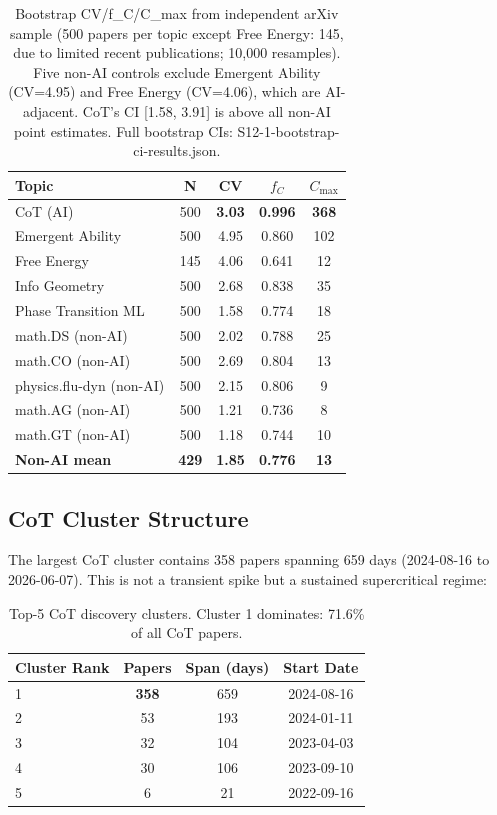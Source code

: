\documentclass[12pt]{article}
\begin{document}
\begin{table}[t]
  \centering
  \begin{tabular}{lcccc}
    \toprule
    \textbf{Topic} & \textbf{N} & \textbf{CV} & \textbf{$f_C$} & \textbf{$C_{\max}$} \\
    \midrule
    CoT (AI) & 500 & \textbf{3.03} & \textbf{0.996} & \textbf{368} \\
    Emergent Ability & 500 & 4.95 & 0.860 & 102 \\
    Free Energy & 145 & 4.06 & 0.641 & 12 \\
    Info Geometry & 500 & 2.68 & 0.838 & 35 \\
    Phase Transition ML & 500 & 1.58 & 0.774 & 18 \\
    \midrule
    math.DS (non-AI) & 500 & 2.02 & 0.788 & 25 \\
    math.CO (non-AI) & 500 & 2.69 & 0.804 & 13 \\
    physics.flu-dyn (non-AI) & 500 & 2.15 & 0.806 & 9 \\
    math.AG (non-AI) & 500 & 1.21 & 0.736 & 8 \\
    math.GT (non-AI) & 500 & 1.18 & 0.744 & 10 \\
    \midrule
    \textbf{Non-AI mean} & \textbf{429} & \textbf{1.85} & \textbf{0.776} & \textbf{13} \\
    \bottomrule
  \end{tabular}
  \caption{Bootstrap CV/f\_C/C\_max from independent arXiv sample (500 papers per topic except Free Energy: 145, due to limited recent publications; 10,000 resamples). Five non-AI controls exclude Emergent Ability (CV=4.95) and Free Energy (CV=4.06), which are AI-adjacent. CoT's CI [1.58, 3.91] is above all non-AI point estimates. Full bootstrap CIs: S12-1-bootstrap-ci-results.json.}
  \label{tab:bootstrap-ci}
\end{table}

\subsection{CoT Cluster Structure}

The largest CoT cluster contains 358 papers spanning 659 days (2024-08-16 to 2026-06-07). This is not a transient spike but a sustained supercritical regime:

\begin{table}[htbp]
  \centering
  \begin{tabular}{lccc}
    \toprule
    Cluster Rank & Papers & Span (days) & Start Date \\
    \midrule
    1 & \textbf{358} & 659 & 2024-08-16 \\
    2 & 53 & 193 & 2024-01-11 \\
    3 & 32 & 104 & 2023-04-03 \\
    4 & 30 & 106 & 2023-09-10 \\
    5 & 6 & 21 & 2022-09-16 \\
    \bottomrule
  \end{tabular}
  \caption{Top-5 CoT discovery clusters. Cluster 1 dominates: 71.6\% of all CoT papers.}
  \label{tab:clusters}
\end{table}
\end{document}
